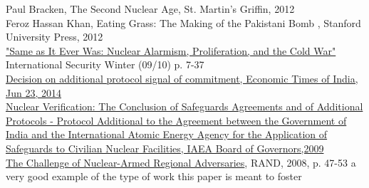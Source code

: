 \documentclass[journal]{IEEEtran}
\begin{document}
\begin{thebibliography}{1}
 Paul Bracken, The Second Nuclear Age, St. Martin's Griffin, 2012\\

 Feroz Hassan Khan, Eating Grass: The Making of the Pakistani Bomb , Stanford University Press, 2012\\

 \href{http://www.mitpressjournals.org/doi/pdf/10.1162/isec.2010.34.3.7}{"Same as It Ever Was: Nuclear Alarmism, Proliferation, and the Cold War"} International Security Winter (09/10) p. 7-37\\

\href{http://articles.economictimes.indiatimes.com/2014-06-23/news/50798298_1_civilian-nuclear-facilities-protocol-iaea}{Decision on additional protocol signal of commitment, Economic Times of India, Jun 23, 2014}\\

\href{https://armscontrollaw.files.wordpress.com/2014/06/indias-iaea-ap.pdf}{Nuclear Verification:
The Conclusion of Safeguards Agreements and 
of Additional Protocols - Protocol Additional to the Agreement between the Government of India and the International Atomic Energy Agency for the Application of Safeguards to Civilian Nuclear Facilities, IAEA Board of Governors,2009}\\

\href{http://www.rand.org/content/dam/rand/pubs/monographs/2008/RAND_MG671.pdf}{The Challenge of Nuclear-Armed Regional Adversaries}, RAND, 2008, p. 47-53 a very good example of the type of work this paper is meant to foster
\end{thebibliography}

% 







\end{document}
